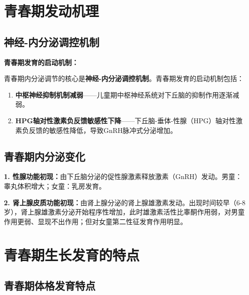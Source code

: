 \section{青春期发动机理}\difficulty

\subsection{神经-内分泌调控机制}

\begin{keybox}
\textbf{青春期发育的启动机制：}

青春期内分泌调节的核心是\textbf{神经-内分泌调控机制}。青春期发育的启动机制包括：

\begin{enumerate}[leftmargin=*]
    \item \textbf{中枢神经抑制机制减弱}——儿童期中枢神经系统对下丘脑的抑制作用逐渐减弱。
    \item \textbf{HPG轴对性激素负反馈敏感性下降}——下丘脑-垂体-性腺（HPG）轴对性激素负反馈的敏感性降低，导致GnRH脉冲式分泌增加。
\end{enumerate}
\end{keybox}

\subsection{青春期内分泌变化}

\begin{keybox}
\textbf{1. 性腺功能初现：}由下丘脑分泌的促性腺激素释放激素（GnRH）发动。男童：睾丸体积增大；女童：乳房发育。

\textbf{2. 肾上腺皮质功能初现：}由肾上腺分泌的肾上腺雄激素发动。出现时间较早（6-8岁），肾上腺雄激素分泌开始程序性增加，此时雄激素活性比睾酮作用弱，对男童作用更弱、显现不出作用；但对女童第二性征发育作用明显。
\end{keybox}

\section{青春期生长发育的特点}

\subsection{青春期体格发育特点}

